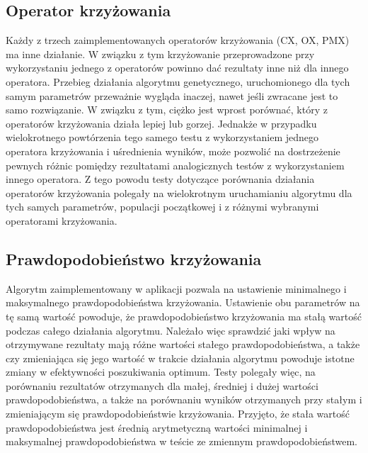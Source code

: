 \subsection{Operator krzyżowania}
Każdy z trzech zaimplementowanych operatorów krzyżowania (CX, OX, PMX) ma inne działanie. W związku z tym krzyżowanie przeprowadzone przy wykorzystaniu jednego z operatorów powinno dać rezultaty inne niż dla innego operatora. Przebieg działania algorytmu genetycznego, uruchomionego dla tych samym parametrów przeważnie wygląda inaczej, nawet jeśli zwracane jest to samo rozwiązanie. W związku z tym, ciężko jest wprost porównać, który z operatorów krzyżowania działa lepiej lub gorzej. Jednakże w przypadku wielokrotnego powtórzenia tego samego testu z wykorzystaniem jednego operatora krzyżowania i uśrednienia wyników, może pozwolić na dostrzeżenie pewnych różnic pomiędzy rezultatami analogicznych testów z wykorzystaniem innego operatora. Z tego powodu testy dotyczące porównania działania operatorów krzyżowania polegały na wielokrotnym uruchamianiu algorytmu dla tych samych parametrów, populacji początkowej i z różnymi wybranymi operatorami krzyżowania.

\subsection{Prawdopodobieństwo krzyżowania}
Algorytm zaimplementowany w aplikacji pozwala na ustawienie minimalnego i maksymalnego prawdopodobieństwa krzyżowania. Ustawienie obu parametrów na tę samą wartość powoduje, że prawdopodobieństwo krzyżowania ma stałą wartość podczas całego działania algorytmu. Należało więc sprawdzić jaki wpływ na otrzymywane rezultaty mają różne wartości stałego prawdopodobieństwa, a także czy zmieniająca się jego wartość w trakcie działania algorytmu powoduje istotne zmiany w efektywności poszukiwania optimum. Testy polegały więc, na porównaniu rezultatów otrzymanych dla małej, średniej i dużej wartości prawdopodobieństwa, a także na porównaniu wyników otrzymanych przy stałym i zmieniającym się prawdopodobieństwie krzyżowania. Przyjęto, że stała wartość prawdopodobieństwa jest średnią arytmetyczną wartości minimalnej i maksymalnej prawdopodobieństwa w teście ze zmiennym prawdopodobieństwem.

